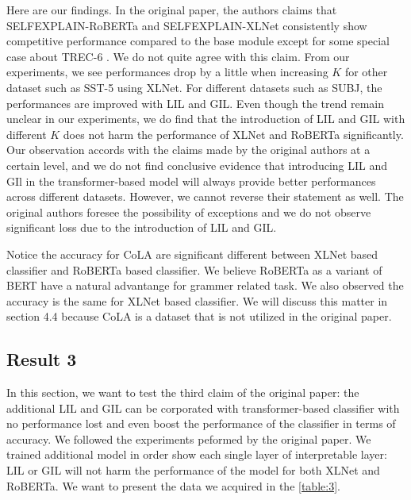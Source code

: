 \documentclass{article}
\begin{document}
Here are our findings. In the original paper, the authors claims that SELFEXPLAIN-RoBERTa 
and SELFEXPLAIN-XLNet consistently show competitive performance compared to the base module
except for some special case about TREC-6 \cite{rajagopal-etal-2021-selfexplain}. We do not 
quite agree with this claim. From our experiments, we see performances drop by a little when increasing 
$K$ for other dataset such as SST-5 using XLNet. For different datasets such as SUBJ, the performances
are improved with LIL and GIL. Even though the trend remain unclear in our experiments, we 
do find that the introduction of LIL and GIL with different $K$ does not harm the performance
of XLNet and RoBERTa significantly. Our observation accords with the claims made by the original authors at 
a certain level, and we do not find conclusive evidence that introducing LIL and GIl 
in the transformer-based model will always provide better performances across different datasets.
However, we cannot reverse their statement as well. The original authors foresee the possibility 
of exceptions and we do not observe significant loss due to the introduction of LIL and GIL.

Notice the accuracy for CoLA are significant different between XLNet based classifier and 
RoBERTa based classifier. We believe RoBERTa as a variant of BERT have a natural advantange 
for grammer related task. We also observed the accuracy is the same for XLNet based classifier.
We will discuss this matter in section 4.4 because CoLA is a dataset that is not utilized 
in the original paper.

\subsection{Result 3}

In this section, we want to test the third claim of the original paper:
 the additional LIL and GIL can be corporated with transformer-based 
classifier with no performance lost and even boost the performance of the classifier in terms 
of accuracy. We followed the experiments peformed by the original paper. We trained additional 
model in order show each single layer of interpretable layer: LIL or GIL will not harm the 
performance of the model for both XLNet and RoBERTa. We want to present the data we acquired
in the \ref{table:3}.
\end{document}
